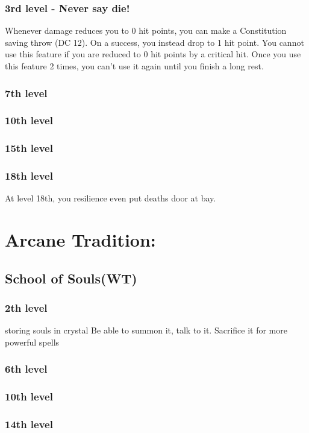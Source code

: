 \subsubsection{3rd level - Never say die!}
Whenever damage reduces you to 0 hit points, you can make a Constitution saving throw (DC 12). On a success, you instead drop to 1 hit point. You cannot use this feature if you are reduced to 0 hit points by a  critical hit.
Once you use this feature 2 times, you can’t use it again until you finish a long rest.

\subsubsection{7th level}

\subsubsection{10th level}

\subsubsection{15th level}

\subsubsection{18th level}
At level 18th, you resilience even put deaths door at bay.

\section{Arcane Tradition:}
\subsection{School of Souls(WT)}

\subsubsection{2th level}
storing souls in crystal
	Be able to summon it, talk to it.
	Sacrifice it for more powerful spells
	

\subsubsection{6th level}

\subsubsection{10th level}

\subsubsection{14th level}